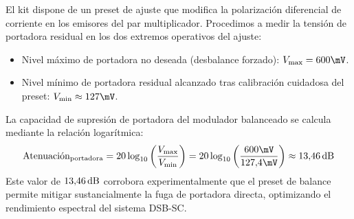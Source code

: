 El kit dispone de un preset de ajuste que modifica la polarización diferencial de corriente en los emisores del par
multiplicador. Procedimos a medir la tensión de portadora residual en los dos extremos operativos del ajuste:
\begin{itemize}
    \item Nivel máximo de portadora no deseada (desbalance forzado): $V_{\mathrm{max}} = 600\mV$.
    \item Nivel mínimo de portadora residual alcanzado tras calibración cuidadosa del preset: $V_{\mathrm{min}} \approx 127\mV$.
\end{itemize}
La capacidad de supresión de portadora del modulador balanceado se calcula mediante la relación logarítmica:
\begin{equation}
    \text{Atenuación}_{\mathrm{portadora}} = 20 \log_{10}\left(\frac{V_{\mathrm{max}}}{V_{\mathrm{min}}}\right) = 20 \log_{10}\left(\frac{600\mV}{127{,}4\mV}\right) \approx 13{,}46\dB
    \label{eq.dsbsc:rechazo_calculo}
\end{equation}
Este valor de $13{,}46\,\mathrm{dB}$ corrobora experimentalmente que el preset de balance permite mitigar sustancialmente la fuga
de portadora directa, optimizando el rendimiento espectral del sistema DSB-SC.
